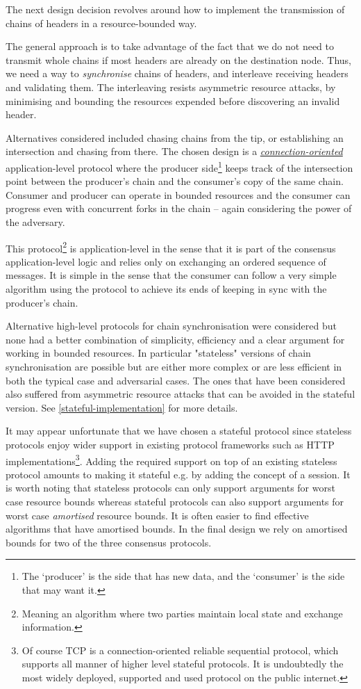 \documentclass[11pt,a4paper]{article}
\begin{document}
The next design decision revolves around how to implement the
transmission of chains of headers in a resource-bounded way.

The general approach is to take advantage of the fact that we do not
need to transmit whole chains if most headers are already on the
destination node. Thus, we need a way to \emph{synchronise} chains of
headers, and interleave receiving headers and validating them. The
interleaving resists asymmetric resource attacks, by minimising and
bounding the resources expended before discovering an invalid header.

Alternatives considered included chasing chains from the tip, or
establishing an intersection and chasing from there. The chosen design
is a
\emph{\href{https://en.wikipedia.org/wiki/Connection-oriented_communication}{{connection-oriented}}}
application-level protocol where the producer side\footnote{The
  `producer' is the side that has new data, and the `consumer' is the
  side that may want it.} keeps track of the intersection point between
the producer's chain and the consumer's copy of the same chain. Consumer
and producer can operate in bounded resources and the consumer can
progress even with concurrent forks in the chain -- again considering
the power of the adversary.

This protocol\footnote{Meaning an algorithm where two parties maintain
  local state and exchange information.} is application-level in the
sense that it is part of the consensus application-level logic and
relies only on exchanging an ordered sequence of messages. It is simple
in the sense that the consumer can follow a very simple algorithm using
the protocol to achieve its ends of keeping in sync with the producer's
chain.

Alternative high-level protocols for chain synchronisation were
considered but none had a better combination of simplicity, efficiency
and a clear argument for working in bounded resources. In particular
"stateless" versions of chain synchronisation are possible but are
either more complex or are less efficient in both the typical case and
adversarial cases. The ones that have been considered also suffered from
asymmetric resource attacks that can be avoided in the stateful version.
See \cref{stateful-implementation} for more
details.

It may appear unfortunate that we have chosen a stateful protocol since
stateless protocols enjoy wider support in existing protocol frameworks
such as HTTP implementations\footnote{Of course TCP is a
  connection-oriented reliable sequential protocol, which supports all
  manner of higher level stateful protocols. It is undoubtedly the most
  widely deployed, supported and used protocol on the public internet.}.
Adding the required support on top of an existing stateless protocol
amounts to making it stateful e.g. by adding the concept of a session.
It is worth noting that stateless protocols can only support arguments
for worst case resource bounds whereas stateful protocols can also
support arguments for worst case \emph{amortised} resource bounds. It is
often easier to find effective algorithms that have amortised bounds. In
the final design we rely on amortised bounds for two of the three
consensus protocols.
\end{document}

